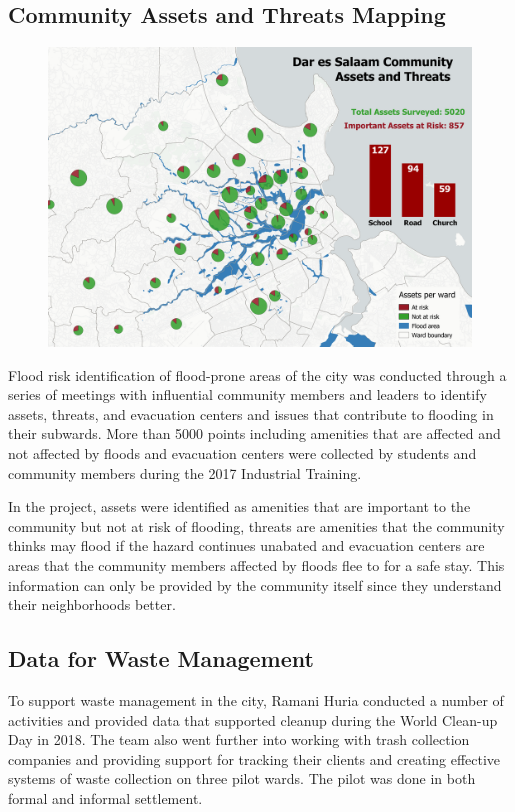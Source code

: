 \documentclass[a4paper,12pt,twoside]{article}
\begin{document}
\newpage
\subsection{Community Assets and Threats Mapping}
\begin{figure}[h]
    \centering
    \includegraphics[width=.8\textwidth]{images/asset_pie_min.png}
    \label{fig:my_label}
\end{figure}

\begin{multicols}{2}
Flood risk identification of flood-prone areas of the city was conducted through a series of meetings with influential community members and leaders to identify assets, threats, and evacuation centers and issues that contribute to flooding in their subwards. More than 5000 points including amenities that are affected and not affected by floods and evacuation centers were collected by students and community members during the 2017 Industrial Training.

In the project, assets were identified as amenities that are important to the community but not at risk of flooding, threats are amenities that the community thinks may flood if the hazard continues unabated and evacuation centers are areas that the community members affected by floods flee to for a safe stay. This information can only be provided by the community itself since they understand their neighborhoods better.
\end{multicols}

\newpage
\subsection{Data for Waste Management}
\begin{multicols}{2}
To support waste management in the city, Ramani Huria conducted a number of activities and provided data that supported cleanup during the World Clean-up Day in 2018. The team also went further into working with trash collection companies and providing support for tracking their clients and creating effective systems of waste collection on three pilot wards. The pilot was done in both formal and informal settlement.
\end{multicols}
\end{document}
